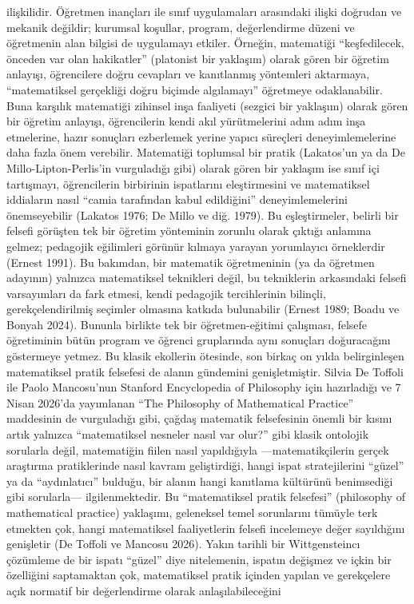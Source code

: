 ilişkilidir. Öğretmen inançları ile sınıf uygulamaları arasındaki ilişki doğrudan ve mekanik değildir; kurumsal koşullar, program, değerlendirme düzeni ve öğretmenin alan bilgisi de uygulamayı etkiler. Örneğin, matematiği “keşfedilecek, önceden var olan hakikatler” (platonist bir yaklaşım) olarak gören bir öğretim anlayışı, öğrencilere doğru cevapları ve kanıtlanmış yöntemleri aktarmaya, “matematiksel gerçekliği doğru biçimde algılamayı” öğretmeye odaklanabilir. Buna karşılık matematiği zihinsel inşa faaliyeti (sezgici bir yaklaşım) olarak gören bir öğretim anlayışı, öğrencilerin kendi akıl yürütmelerini adım adım inşa etmelerine, hazır sonuçları ezberlemek yerine yapıcı süreçleri deneyimlemelerine daha fazla önem verebilir. Matematiği toplumsal bir pratik (Lakatos’un ya da De Millo-Lipton-Perlis’in vurguladığı gibi) olarak gören bir yaklaşım ise sınıf içi tartışmayı, öğrencilerin birbirinin ispatlarını eleştirmesini ve matematiksel iddiaların nasıl “camia tarafından kabul edildiğini” deneyimlemelerini önemseyebilir (Lakatos 1976; De Millo ve diğ. 1979). Bu eşleştirmeler, belirli bir felsefi görüşten tek bir öğretim yönteminin zorunlu olarak çıktığı anlamına gelmez; pedagojik eğilimleri görünür kılmaya yarayan yorumlayıcı örneklerdir (Ernest 1991). Bu bakımdan, bir matematik öğretmeninin (ya da öğretmen adayının) yalnızca matematiksel teknikleri değil, bu tekniklerin arkasındaki felsefi varsayımları da fark etmesi, kendi pedagojik tercihlerinin bilinçli, gerekçelendirilmiş seçimler olmasına katkıda bulunabilir (Ernest 1989; Boadu ve Bonyah 2024). Bununla birlikte tek bir öğretmen-eğitimi çalışması, felsefe öğretiminin bütün program ve öğrenci gruplarında aynı sonuçları doğuracağını göstermeye yetmez. Bu klasik ekollerin ötesinde, son birkaç on yılda belirginleşen matematiksel pratik felsefesi de alanın gündemini genişletmiştir. Silvia De Toffoli ile Paolo Mancosu’nun Stanford Encyclopedia of Philosophy için hazırladığı ve 7 Nisan 2026’da yayımlanan “The Philosophy of Mathematical Practice” maddesinin de vurguladığı gibi, çağdaş matematik felsefesinin önemli bir kısmı artık yalnızca “matematiksel nesneler nasıl var olur?” gibi klasik ontolojik sorularla değil, matematiğin fiilen nasıl yapıldığıyla —matematikçilerin gerçek araştırma pratiklerinde nasıl kavram geliştirdiği, hangi ispat stratejilerini “güzel” ya da “aydınlatıcı” bulduğu, bir alanın hangi kanıtlama kültürünü benimsediği gibi sorularla— ilgilenmektedir. Bu “matematiksel pratik felsefesi” (philosophy of mathematical practice) yaklaşımı, geleneksel temel sorunlarını tümüyle terk etmekten çok, hangi matematiksel faaliyetlerin felsefi incelemeye değer sayıldığını genişletir (De Toffoli ve Mancosu 2026). Yakın tarihli bir Wittgensteincı çözümleme de bir ispatı “güzel” diye nitelemenin, ispatın değişmez ve içkin bir özelliğini saptamaktan çok, matematiksel pratik içinden yapılan ve gerekçelere açık normatif bir değerlendirme olarak anlaşılabileceğini

